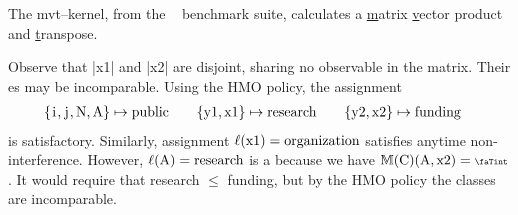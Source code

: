 \begin{example}
The mvt--kernel, from the ~\cite{polybench}  benchmark suite, calculates a \underline{m}atrix \underline{v}ector
product and \underline{t}ranspose.

\begin{center}
\begin{minipage}{.55\textwidth}
\end{minipage}\hfill%
\begin{minipage}[b]{.40\textwidth}
\hfill\scalebox{.85}{$%
\begin{pNiceMatrix}[first-row,first-col]
& \prc|i|  & \prc|j| & \prc|N|
  & \prc|x1| & \prc|x2| & \prc|y1| & \prc|y2| & \prc|A| \\
\prc|i|   & \nv & \vi & \nv & \vi & \vi & \nv & \nv & \nv  \\
\prc|j|   & \nv & \nv & \nv & \vi & \vi & \nv & \nv & \nv  \\
\prc|N|   & \vi & \vi & \nv & \vi & \vi & \nv & \nv & \nv  \\
\prc|x1|  & \nv & \nv & \nv & \nv & \nv & \nv & \nv & \nv  \\
\prc|x2|  & \nv & \nv & \nv & \nv & \nv & \nv & \nv & \nv  \\
\prc|y1|  & \nv & \nv & \nv & \vi & \nv & \nv & \nv & \nv  \\
\prc|y2|  & \nv & \nv & \nv & \nv & \vi & \nv & \nv & \nv  \\
\prc|A|   & \nv & \nv & \nv & \vi & \vi & \nv & \nv & \nv  \\
\end{pNiceMatrix}$}
\end{minipage}
\end{center}

Observe that \prc|x1| and \prc|x2| are disjoint, sharing no observable
 in the matrix. Their es may be
incomparable. Using the HMO policy, the assignment
\begin{align*}
\{\prc|i|, \prc|j|, \prc|N|, \prc|A|\} &\mapsto \text{public} &&&
\{\prc|y1|, \prc|x1|\} & \mapsto \text{research} &&&
\{\prc|y2|, \prc|x2|\} & \mapsto \text{funding}
\end{align*}
is satisfactory.
Similarly, assignment \(\lvl{\prc|x1|} = \text{organization}\)
satisfies anytime non-interference.
However, \(\lvl{\prc|A|} =
\text{research}\) is a  because we have
$\sfm{\prc|C|}(\prc|A|,\prc|x2|)=\vi$. It would require that
research $\leqslant$ funding, but by the HMO policy the classes are
incomparable.
\end{example}

